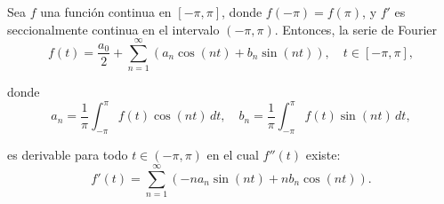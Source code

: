 \begin{teorema}[Derivación]
Sea $f$ una función continua en $[-\pi,\pi]$, donde $f(-\pi) = f(\pi)$, y $f'$ es seccionalmente continua en el intervalo $(-\pi,\pi)$. Entonces, la serie de Fourier
\begin{equation*}
    f(t) = \frac{a_0}{2} + \sum_{n=1}^{\infty} (a_n \cos(nt) + b_n \sin (nt) ), \quad t \in [-\pi,\pi],
\end{equation*}

donde 
$$a_n = \frac{1}{\pi} \int_{-\pi}^{\pi} f(t) \cos(nt) \,dt, \quad b_n = \frac{1}{\pi} \int_{-\pi}^{\pi} f(t) \sin(nt) \,dt,$$

es derivable para todo $t \in (-\pi,\pi)$ en el cual $f''(t)$ existe:
\begin{equation*}
    f'(t) = \sum_{n=1}^{\infty} (- n a_n \sin(nt) + nb_n \cos(nt)).
\end{equation*}
\end{teorema}



